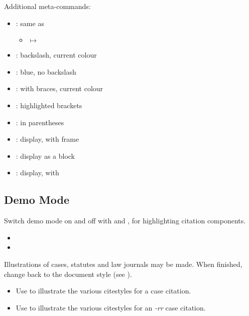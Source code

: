 \p Additional meta-commands:
\begin{itemize}
\item {}: same as 
\begin{itemize}
\item {} $\mapsto$ 
\end{itemize}
\item {}: backslash, current colour
\item {}: blue, no backslash
\item {}:  with braces, current colour 
\item {}: highlighted brackets
\item {}: in parentheses
\item {}: display, with frame
\item {}: display as a block
\item {}: display, with 
\end{itemize}

\subsection{Demo Mode}%
\p Switch demo mode on and off with  and , for highlighting citation components.

\lcsetdemoon
\begin{itemize}
\item {}
\item {}
\end{itemize}
\lcsetdemooff

\p {}Illustrations of cases, statutes and law journals may be made. When finished, change back to the document style (see ).

\begin{itemize}
\item Use  to illustrate the various citestyles for a case citation.
\end{itemize}


\begin{itemize}
\item Use  to illustrate the various citestyles for an \textit{-rr} case citation.
\end{itemize}

